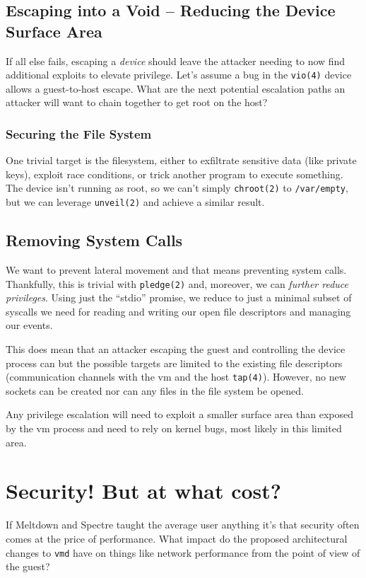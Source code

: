 \documentclass[conference]{IEEEtran}
\begin{document}
\subsection{Escaping into a Void -- Reducing the Device Surface Area}
If all else fails, escaping a \emph{device} should leave the attacker
needing to now find additional exploits to elevate privilege. Let's
assume a bug in the \texttt{vio(4)} device allows a guest-to-host
escape. What are the next potential escalation paths an attacker will
want to chain together to get root on the host?

\vspace{2mm}
\subsubsection{Securing the File System}
One trivial target is the filesystem, either to exfiltrate sensitive
data (like private keys), exploit race conditions, or trick another
program to execute something. The device isn't running as root, so we
can't simply \texttt{chroot(2)} to \texttt{/var/empty}, but we can
leverage \texttt{unveil(2)} and achieve a similar result.

\vspace{2mm}
\subsection{Removing System Calls}
We want to prevent lateral movement and that means preventing system
calls. Thankfully, this is trivial with \texttt{pledge(2)} and,
moreover, we can \emph{further reduce privileges}. Using just the
``stdio'' promise, we reduce to just a minimal subset of syscalls we
need for reading and writing our open file descriptors and managing
our events.

This does mean that an attacker escaping the guest and controlling the
device process can  but the possible targets
are limited to the existing file descriptors (communication channels
with the vm and the host \texttt{tap(4)}). However, no new sockets can
be created nor can any files in the file system be opened.

Any privilege escalation will need to exploit a smaller surface area
than exposed by the vm process and need to rely on kernel bugs, most
likely in this limited area.


\vspace{5mm}
\section{Security! But at what cost?}
If Meltdown and Spectre taught the average user anything it's that
security often comes at the price of performance. What impact do the
proposed architectural changes to \texttt{vmd} have on things like
network performance from the point of view of the guest?
\end{document}
